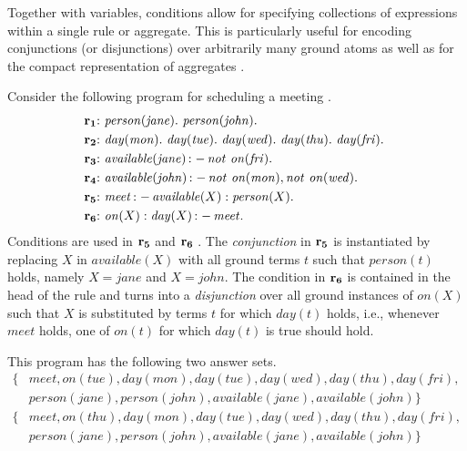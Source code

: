 \documentclass[a4paper, titlepage]{article}
\newcommand{\mi}[1]{\mathit{#1}}
\DeclareMathOperator{\leftimpl}{:-}
\DeclareMathOperator{\nott}{\mathit{not}}
\newcommand{\row}[1]{%
  \ensuremath{\color{black}\ensuremath{\mathbf{#1}} \color{black}}%
}
\newcommand{\rowprefix}[1]{%
  \ensuremath{\color{black}\mathbf{#1{:}}\ }%
}
\begin{document}
Together with variables, conditions allow for specifying 
collections of expressions within a single rule or 
aggregate. This is particularly useful for encoding 
conjunctions (or disjunctions) over arbitrarily many ground 
atoms as well as for the compact representation of 
aggregates \cite{gkklorst2015}. 

\begin{exmp}
Consider the following program for scheduling a meeting \cite{gkklorst2015}.
\begin{align*}
\rowprefix{r_1}& \mathit{person}(\mathit{jane}). \  \mathit{person}
(\mathit{john}).\\
\rowprefix{r_2}& \mathit{day}(\mathit{mon}). \ \mathit{day}
(\mathit{tue}). \ \mathit{day}(\mathit{wed}). \ \mathit{day}
(\mathit{thu}). \ \mathit{day}(\mathit{fri}). \ \\
\rowprefix{r_3}& \mathit{available}(\mathit{jane}) \leftimpl \nott \thinspace  
\mathit{on}(\mathit{fri}).\\
\rowprefix{r_4}& \mathit{available}(\mathit{john}) \leftimpl 
\nott \thinspace \mathit{on}(\mathit{mon}), \nott \thinspace \mathit{on}(\mathit{wed}).\\
\rowprefix{r_5}& \mathit{meet} \leftimpl \mathit{available}(X) : 
\mathit{person}(X).\\
\rowprefix{r_6}& \mathit{on}(X) : \mathit{day}(X) \leftimpl 
\mathit{meet}.
\end{align*}
Conditions are used in \row{r_5} and \row{r_6}.
%
The \emph{conjunction} in \row{r_5} is instantiated by 
replacing $X$ in $\mathit{available(X)}$ with all ground 
terms $t$ such that $\mathit{person(t)}$ holds, namely
$\mathit{X=jane}$ and $\mathit{X=john}$.
%
The condition in $\row{r_6}$ is contained in the head of the rule
and turns into a \emph{disjunction} over all ground instances of 
$\mathit{on(X)}$ such that $X$ is substituted by terms $t$ 
for which $\mathit{day(t)}$ holds, i.e.,
whenever $\mathit{meet}$ holds,
one of $\mathit{on(t)}$ for which $\mathit{day(t)}$ is true should hold.

This program has the following two answer sets.
\begin{align*}
  \{ & \mi{meet,on(tue),day(mon),day(tue),day(wed),day(thu),day(fri),}  \\
     & \mi{person(jane),person(john),available(jane),available(john)}\} \\
  \{ & \mi{meet,on(thu),day(mon),day(tue),day(wed),day(thu),day(fri),}  \\
     & \mi{person(jane),person(john),available(jane),available(john)}\}
\end{align*}
\end{exmp}
\end{document}
